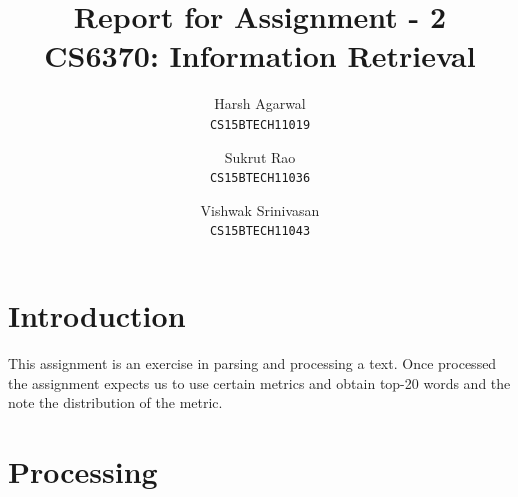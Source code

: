 \documentclass{article}
\title{Report for Assignment - 2 \\ CS6370: Information Retrieval}
\author{
Harsh Agarwal\\\texttt{CS15BTECH11019}
\and
Sukrut Rao\\\texttt{CS15BTECH11036}
\and
Vishwak Srinivasan\\\texttt{CS15BTECH11043}
}
\date{}
\begin{document}
\maketitle

\section{Introduction}
\begin{flushleft}
This assignment is an exercise in parsing and processing a text. Once processed the assignment expects us to use certain metrics and obtain top-20 words and the note the distribution of the metric.
\end{flushleft}

\section{Processing}
\end{document}
